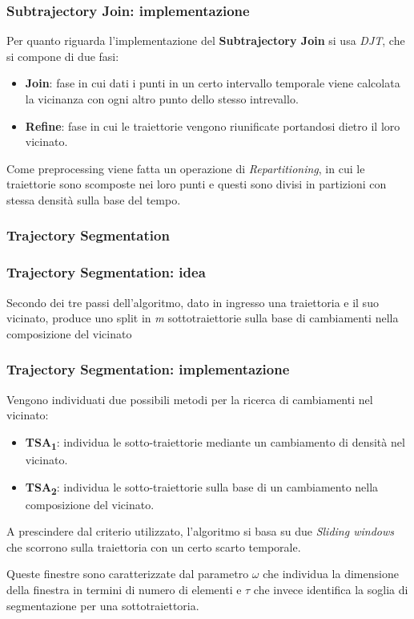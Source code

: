 \documentclass{beamer}
\begin{document}
\begin{frame}
	\frametitle{Subtrajectory Join: implementazione}
Per quanto riguarda l'implementazione del \textbf{Subtrajectory Join} si usa \textit{DJT}, che si compone di due fasi:

\begin{itemize}
	\item \textbf{Join}: fase in cui dati i punti in un certo intervallo temporale  viene calcolata la vicinanza con ogni altro punto dello stesso intrevallo.
	\item \textbf{Refine}: fase in cui le traiettorie vengono riunificate portandosi dietro il loro vicinato.
\end{itemize}

Come preprocessing viene fatta un operazione di \textit{Repartitioning}, in cui le traiettorie sono scomposte nei loro punti e questi sono divisi in partizioni con stessa densità sulla base del tempo.

\end{frame}

\subsubsection{Trajectory Segmentation}

\begin{frame}
	\frametitle{Trajectory Segmentation: idea}
	Secondo dei tre passi dell'algoritmo, dato in ingresso una traiettoria e il suo vicinato, produce uno split in \textit{m} sottotraiettorie sulla base di cambiamenti nella composizione del vicinato
\end{frame}

\begin{frame}
	\frametitle{Trajectory Segmentation: implementazione}
    Vengono individuati due possibili metodi per la ricerca di cambiamenti nel vicinato:
    \begin{itemize}
    	\item \textbf{TSA\textsubscript{1}}: individua le sotto-traiettorie mediante un cambiamento di densità nel vicinato.
    	\item \textbf{TSA\textsubscript{2}}: individua le sotto-traiettorie sulla base di un cambiamento nella composizione del vicinato.
    \end{itemize}

A prescindere dal criterio utilizzato, l'algoritmo si basa su due \textit{Sliding windows} che scorrono sulla traiettoria con un certo scarto temporale.

Queste finestre sono caratterizzate dal parametro $\omega$ che individua la dimensione della finestra in termini di numero di elementi e $\tau$ che invece identifica la soglia di segmentazione per una sottotraiettoria.
\end{frame}
\end{document}
